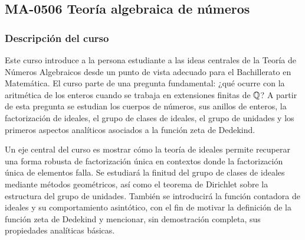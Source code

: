 \newpage
\subsection*{MA-0506 Teoría algebraica de números}

\hypertarget{MA0506}{}
\begin{refsection}
\begin{table}[H]
\end{table}



\subsubsection*{Descripción del curso}

Este curso introduce a la persona estudiante a las ideas centrales de la Teoría de Números Algebraicos desde un punto de vista adecuado para el Bachillerato en Matemática. El curso parte de una pregunta fundamental: ¿qué ocurre con la aritmética de los enteros cuando se trabaja en extensiones finitas de $\mathbb{Q}$? A partir de esta pregunta se estudian los cuerpos de números, sus anillos de enteros, la factorización de ideales, el grupo de clases de ideales, el grupo de unidades y los primeros aspectos analíticos asociados a la función zeta de Dedekind.

Un eje central del curso es mostrar cómo la teoría de ideales permite recuperar una forma robusta de factorización única en contextos donde la factorización única de elementos falla. Se estudiará la finitud del grupo de clases de ideales mediante métodos geométricos, así como el teorema de Dirichlet sobre la estructura del grupo de unidades. También se introducirá la función contadora de ideales y su comportamiento asintótico, con el fin de motivar la definición de la función zeta de Dedekind y mencionar, sin demostración completa, sus propiedades analíticas básicas.


\end{refsection}
